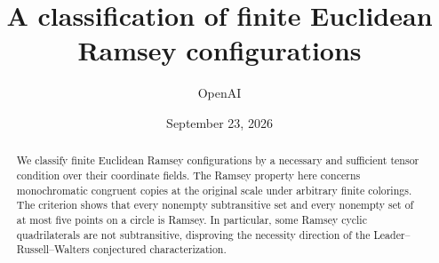 \documentclass[11pt,a4paper]{article}
\title{A classification of finite Euclidean Ramsey configurations}
\author{OpenAI}
\date{September 23, 2026}
\theoremstyle{definition}
\theoremstyle{remark}
\begin{document}
\maketitle
\begin{abstract}
We classify finite Euclidean Ramsey configurations by a necessary and
sufficient tensor condition over their coordinate fields. The Ramsey
property here concerns monochromatic congruent copies at the original
scale under arbitrary finite colorings. The criterion shows that every
nonempty subtransitive set and every nonempty set of at most five points
on a circle is Ramsey. In particular, some Ramsey cyclic quadrilaterals
are not subtransitive, disproving the necessity direction of the
Leader--Russell--Walters conjectured characterization.
\end{abstract}
\tableofcontents









\end{document}
